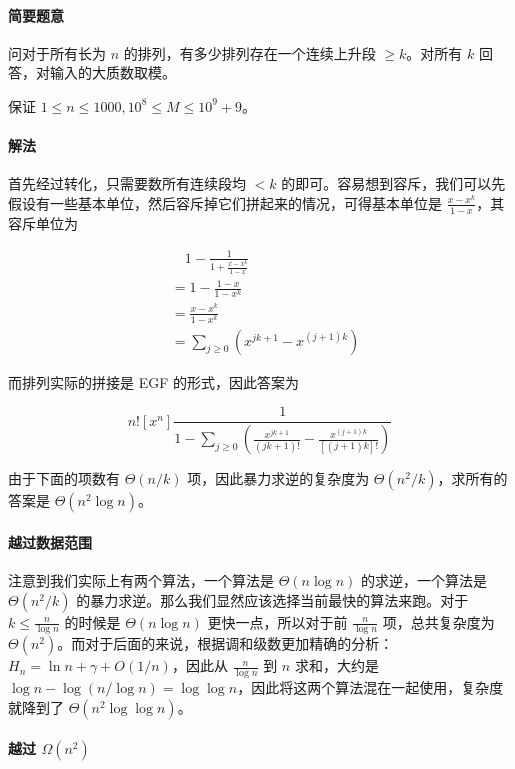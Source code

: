 \documentclass[12pt]{ctexart}
\theoremstyle{theorem}
\theoremstyle{theorem}
\begin{document}
\paragraph{简要题意}

问对于所有长为 $n$ 的排列，有多少排列存在一个连续上升段 $\ge k$。对所有 $k$ 回答，对输入的大质数取模。

保证 $1\le n\le 1000, 10^8\le M\le 10^9+9$。

\paragraph{解法}

首先经过转化，只需要数所有连续段均 $<k$ 的即可。容易想到容斥，我们可以先假设有一些基本单位，然后容斥掉它们拼起来的情况，可得基本单位是 $\frac{x-x^k}{1-x}$，其容斥单位为

$$
\begin{aligned}
&\quad 1-\frac 1{1+\frac{x-x^k}{1-x}}\\
&= 1-\frac{1-x}{1-x^k}\\
&= \frac{x-x^k}{1-x^k}\\
&= \sum_{j\ge 0} \left(x^{jk+1} - x^{(j+1)k}\right)
\end{aligned}
$$

而排列实际的拼接是 EGF 的形式，因此答案为

$$
n![x^n] \frac 1{\displaystyle1 - \sum_{j\ge 0} \left( \frac{x^{jk+1}}{(jk+1)!}  - \frac{x^{(j+1)k}}{[(j+1)k]!}\right)}
$$

由于下面的项数有 $\Theta(n/k)$ 项，因此暴力求逆的复杂度为 $\Theta(n^2/k)$，求所有的答案是 $\Theta(n^2\log n)$。

\paragraph{越过数据范围}

注意到我们实际上有两个算法，一个算法是 $\Theta(n\log n)$ 的求逆，一个算法是 $\Theta(n^2/k)$ 的暴力求逆。那么我们显然应该选择当前最快的算法来跑。对于 $k\le \frac n{\log n}$ 的时候是 $\Theta(n\log n)$ 更快一点，所以对于前 $\frac n{\log n}$ 项，总共复杂度为 $\Theta(n^2)$。而对于后面的来说，根据调和级数更加精确的分析：$H_n = \ln n + \gamma + O(1/n)$，因此从 $\frac n{\log n}$ 到 $n$ 求和，大约是 $\log n - \log(n/\log n) = \log\log n$，因此将这两个算法混在一起使用，复杂度就降到了 $\Theta(n^2\log\log n)$。

\paragraph{越过 $\Omega(n^2)$}
\end{document}
